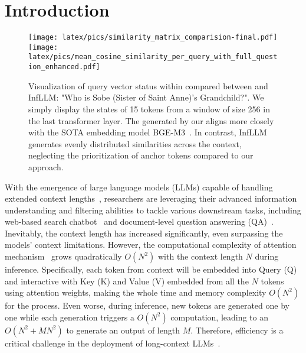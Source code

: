 

\section{Introduction}

\begin{figure}[!ht] 
    \centering
        \texttt{[image: latex/pics/similarity\_matrix\_comparision-final.pdf]}
        \texttt{[image: latex/pics/mean\_cosine\_similarity\_per\_query\_with\_full\_question\_enhanced.pdf]}
    \vspace{-0.2em}
    \caption{Visualization of query vector status within \pq compared between \name and InfLLM: "Who is Sobe (Sister of Saint Anne)’s Grandchild?". We simply display the states of 15 tokens from a window of size 256 in the last transformer layer. The \pq generated by our \name aligns more closely with the SOTA embedding model BGE-M3~\cite{chen-etal-2024-m3}. In contrast, InfLLM generates evenly distributed similarities across the context, neglecting the prioritization of anchor tokens compared to our approach.
    } 
    \vspace{-1em}
    \label{fig:motivation}
\end{figure}

With the emergence of large language models (LLMs) capable of handling extended context lengths~\cite{ wang2024beyond,achiam2023gpt, dubey2024llama}, researchers are leveraging their advanced information understanding and filtering abilities to tackle various downstream tasks, including web-based search chatbot~\cite{Semnani2023WikiChat} and document-level question answering (QA)~\cite{lewis2020retrieval}. 
Inevitably, the context length has increased significantly, even surpassing the models’ context limitations. 
However, the computational complexity of attention mechanism~\cite{vaswani2017attention} grows quadratically $O(N^2)$ with the context length $N$ during inference. Specifically, each token from context will be embedded into Query (Q) and interactive with Key (K) and Value (V) embedded from all the $N$ tokens using attention weights, making the whole time and memory complexity $O(N^2)$ for the process.
Even worse, during inference, new tokens are generated one by one while each generation triggers a $O(N^2)$ computation, leading to an $O(N^2+MN^2)$ to generate an output of length $M$.
Therefore, efficiency is a critical challenge in the deployment of long-context LLMs~\cite{li2024survey}.


